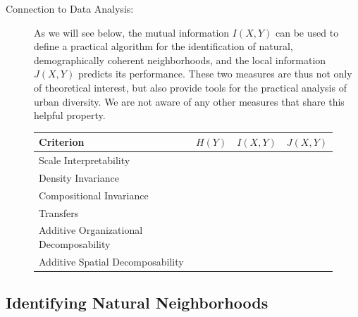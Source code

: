 \begin{description}
		\item[Connection to Data Analysis:] As we will see below, the mutual information $I(X,Y)$ can be used to define a practical algorithm for the identification of natural, demographically coherent neighborhoods, and the local information $J(X,Y)$ predicts its performance. These two measures are thus not only of theoretical interest, but also provide tools for the practical analysis of urban diversity. We are not aware of any other measures that share this helpful property. 
	\end{description}

	\begin{figure}
		\begin{tabular}{l | c c c}
		Criterion & $H(Y)$ & $I(X,Y)$ & $J(X,Y)$ \\
		\hline
		Scale Interpretability & \checkmark & \checkmark & \checkmark \\
		Density Invariance & & & \\
		Compositional Invariance & & & \\
		Transfers & & & \\
		Additive Organizational Decomposability & & & \\
		Additive Spatial Decomposability & & & 
		\end{tabular}
	\end{figure}


\subsection*{Identifying Natural Neighborhoods} 
	
